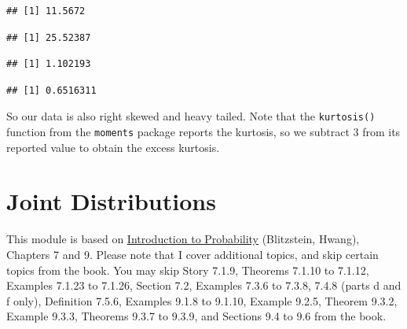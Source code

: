 \documentclass[
]{book}
\newenvironment{Shaded}{\begin{snugshade}}{\end{snugshade}}
\newcommand{\DecValTok}[1]{\textcolor[rgb]{0.00,0.00,0.81}{#1}}
\newcommand{\DocumentationTok}[1]{\textcolor[rgb]{0.56,0.35,0.01}{\textbf{\textit{#1}}}}
\newcommand{\FunctionTok}[1]{\textcolor[rgb]{0.13,0.29,0.53}{\textbf{#1}}}
\newcommand{\NormalTok}[1]{#1}
\newcommand{\SpecialCharTok}[1]{\textcolor[rgb]{0.81,0.36,0.00}{\textbf{#1}}}
\begin{document}
\begin{verbatim}
## [1] 11.5672
\end{verbatim}

\begin{Shaded}
\end{Shaded}

\begin{verbatim}
## [1] 25.52387
\end{verbatim}

\begin{Shaded}
\end{Shaded}

\begin{verbatim}
## [1] 1.102193
\end{verbatim}

\begin{Shaded}
\end{Shaded}

\begin{verbatim}
## [1] 0.6516311
\end{verbatim}

So our data is also right skewed and heavy tailed. Note that the \texttt{kurtosis()} function from the \texttt{moments} package reports the kurtosis, so we subtract 3 from its reported value to obtain the excess kurtosis.

\hypertarget{joint-distributions}{%
\chapter{Joint Distributions}\label{joint-distributions}}

This module is based on \href{https://stat110.hsites.harvard.edu/}{Introduction to Probability} (Blitzstein, Hwang), Chapters 7 and 9. Please note that I cover additional topics, and skip certain topics from the book. You may skip Story 7.1.9, Theorems 7.1.10 to 7.1.12, Examples 7.1.23 to 7.1.26, Section 7.2, Examples 7.3.6 to 7.3.8, 7.4.8 (parts d and f only), Definition 7.5.6, Examples 9.1.8 to 9.1.10, Example 9.2.5, Theorem 9.3.2, Example 9.3.3, Theorems 9.3.7 to 9.3.9, and Sections 9.4 to 9.6 from the book.
\end{document}
